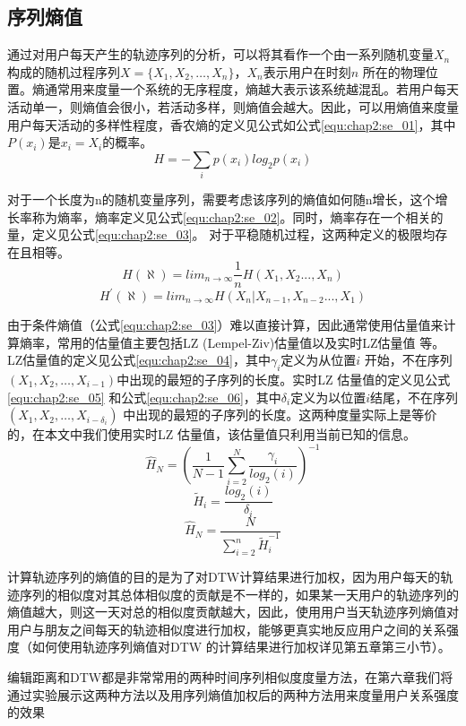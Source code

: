 \subsection{序列熵值}
通过对用户每天产生的轨迹序列的分析，可以将其看作一个由一系列随机变量$X_{n}$构成的随机过程序列$X=\{X_{1},X_{2},…,X_{n}\}$，$X_{n}$表示用户在时刻$n$ 所在的物理位置。熵通常用来度量一个系统的无序程度，熵越大表示该系统越混乱。若用户每天活动单一，则熵值会很小，若活动多样，则熵值会越大。因此，可以用熵值来度量用户每天活动的多样性程度，香农熵的定义见公式如公式\ref{equ:chap2:se_01}，其中$P(x_{i})$是$x_{i}=X_{i}$的概率。
\begin{equation}
\label{equ:chap2:se_01}
H=-\sum_{i}p(x_{i})log_{2}p(x_{i})
\end{equation}
\par 对于一个长度为n的随机变量序列，需要考虑该序列的熵值如何随n增长，这个增长率称为熵率，熵率定义见公式\ref{equ:chap2:se_02}。同时，熵率存在一个相关的量，定义见公式\ref{equ:chap2:se_03}。 对于平稳随机过程，这两种定义的极限均存在且相等。
\begin{equation}
\label{equ:chap2:se_02}
H(\aleph)=lim_{n \rightarrow \infty} \frac{1}{n}H(X_{1},X_{2}...,X_{n})
\end{equation}
\begin{equation}
\label{equ:chap2:se_03}
H^{'}(\aleph)=lim_{n \rightarrow \infty} H(X_{n}|X_{n-1},X_{n-2}...,X_{1})
\end{equation}
\par 由于条件熵值（公式\ref{equ:chap2:se_03}）难以直接计算，因此通常使用估量值来计算熵率，常用的估量值主要包括LZ (Lempel-Ziv)估量值以及实时LZ估量值 等。LZ估量值的定义见公式\ref{equ:chap2:se_04}，其中$\gamma_i$定义为从位置$i$ 开始，不在序列$(X_{1},X_{2},…,X_{i-1})$中出现的最短的子序列的长度。实时LZ 估量值的定义见公式\ref{equ:chap2:se_05} 和公式\ref{equ:chap2:se_06}，其中$\delta_i$定义为以位置$i$结尾，不在序列$(X_{1},X_{2},…,X_{i-\delta_i})$ 中出现的最短的子序列的长度。这两种度量实际上是等价的，在本文中我们使用实时LZ 估量值，该估量值只利用当前已知的信息。
\begin{equation}
\label{equ:chap2:se_04}
\hat{H}_{N}=(\frac{1}{N-1}\sum_{i=2}^{N}\frac{\gamma_i}{log_{2}(i)})^{-1}
\end{equation}
\begin{equation}
\label{equ:chap2:se_05}
\tilde{H}_{i}=\frac{log_{2}(i)}{\delta_i}
\end{equation}
\begin{equation}
\label{equ:chap2:se_06}
\hat{H}_{N}=\frac{N}{\sum_{i=2}^{n}\tilde{H}_{i}^{-1}}
\end{equation}
\par 计算轨迹序列的熵值的目的是为了对DTW计算结果进行加权，因为用户每天的轨迹序列的相似度对其总体相似度的贡献是不一样的，如果某一天用户的轨迹序列的熵值越大，则这一天对总的相似度贡献越大，因此，使用用户当天轨迹序列熵值对用户与朋友之间每天的轨迹相似度进行加权，能够更真实地反应用户之间的关系强度（如何使用轨迹序列熵值对DTW 的计算结果进行加权详见第五章第三小节）。
\par 编辑距离和DTW都是非常常用的两种时间序列相似度度量方法，在第六章我们将通过实验展示这两种方法以及用序列熵值加权后的两种方法用来度量用户关系强度的效果
